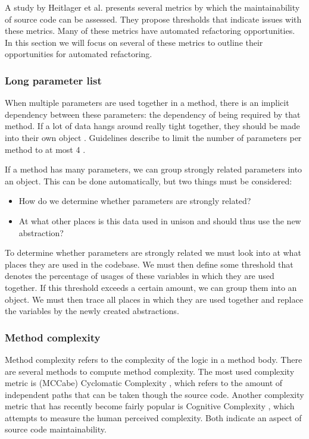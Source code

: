 A study by Heitlager et al. \cite{heitlager2007practical} presents several metrics by which the maintainability of source code can be assessed. They propose thresholds that indicate issues with these metrics. Many of these metrics have automated refactoring opportunities. In this section we will focus on several of these metrics to outline their opportunities for automated refactoring.

\subsubsection{Long parameter list}
When multiple parameters are used together in a method, there is an implicit dependency between these parameters: the dependency of being required by that method. If a lot of data hangs around really tight together, they should be made into their own object \cite{fowler1999refactoring, visser2016building}. Guidelines describe to limit the number of parameters per method to at most 4 \cite{visser2016building}.

If a method has many parameters, we can group strongly related parameters into an object. This can be done automatically, but two things must be considered:
\begin{itemize}
  \item How do we determine whether parameters are strongly related?
  \item At what other places is this data used in unison and should thus use the new abstraction?
\end{itemize}
To determine whether parameters are strongly related we must look into at what places they are used in the codebase. We must then define some threshold that denotes the percentage of usages of these variables in which they are used together. If this threshold exceeds a certain amount, we can group them into an object. We must then trace all places in which they are used together and replace the variables by the newly created abstractions.

\subsubsection{Method complexity}
Method complexity refers to the complexity of the logic in a method body. There are several methods to compute method complexity. The most used complexity metric is (MCCabe) Cyclomatic Complexity \cite{visser2016building}, which refers to the amount of independent paths that can be taken though the source code. Another complexity metric that has recently become fairly popular is Cognitive Complexity \cite{campbell2017cognitive}, which attempts to measure the human perceived complexity. Both indicate an aspect of source code maintainability.

